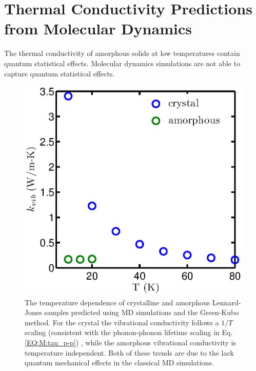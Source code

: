 \documentclass[aps,prb,preprint,superscriptaddress,amsmath,amssymb,floatfix]{revtex4}
\begin{document}
\section{\label{S:Lifetimes}Thermal Conductivity Predictions from 
Molecular Dynamics}
The thermal conductivity of amorphous solids at low temperatures contain 
quantum statistical effects.\cite{freeman_thermal_1986} Molecular dynamics 
simulations are not able to capture quantum statistical effects.
\begin{figure}
\begin{center}
\includegraphics[scale=0.5]{LJ_amor_GK.eps}
\vspace*{-5mm}
\end{center}
\caption{\label{FIG:LJ_amor_GK}The temperature dependence of crystalline 
and amorphous Lennard-Jones samples predicted using MD simulations and the 
Green-Kubo method.\cite{mcgaughey2004a} For the crystal the vibrational 
conductivity follows a $1/T$ scaling (consistent with the phonon-phonon 
lifetime scaling in Eq$.$ \eqref{EQ:M:tau_p-p}) , while the amorphous 
vibrational conductivity is temperature independent. Both of these trends 
are due to the lack quantum mechanical effects in the classical MD 
simulations. }
\end{figure}
\vspace*{40mm}
\end{document}
